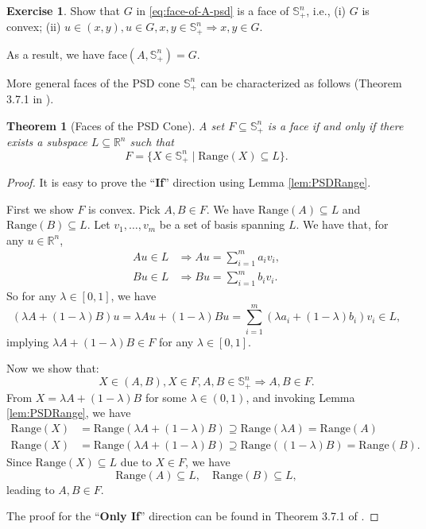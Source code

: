 \documentclass[
]{book}
\newtheorem{theorem}{Theorem}[chapter]
\theoremstyle{definition}
\theoremstyle{definition}
\theoremstyle{definition}
\newtheorem{exercise}{Exercise}[chapter]
\theoremstyle{definition}
\theoremstyle{remark}
\begin{document}
\begin{exercise}
Show that \(G\) in \eqref{eq:face-of-A-psd} is a face of \(\mathbb{S}^{n}_{+}\), i.e., (i) \(G\) is convex; (ii) \(u \in (x,y), u \in G, x,y \in \mathbb{S}^{n}_{+} \Rightarrow x,y \in G\).
\end{exercise}

As a result, we have \(\mathrm{face}(A,\mathbb{S}^{n}_{+}) = G\).

More general faces of the PSD cone \(\mathbb{S}^{n}_{+}\) can be characterized as follows (Theorem 3.7.1 in \citep{wolkowicz12book-sdp}).

\begin{theorem}[Faces of the PSD Cone]
\protect\hypertarget{thm:FacePSD}{}\label{thm:FacePSD}A set \(F \subseteq \mathbb{S}^{n}_{+}\) is a face if and only if there exists a subspace \(L \subseteq \mathbb{R}^{n}\) such that
\[
F = \{ X \in \mathbb{S}^{n}_{+} \mid \mathrm{Range}(X) \subseteq L \}.
\]
\end{theorem}

\begin{proof}
It is easy to prove the ``\textbf{If}'' direction using Lemma \ref{lem:PSDRange}.

First we show \(F\) is convex. Pick \(A,B \in F\). We have \(\mathrm{Range}(A) \subseteq L\) and \(\mathrm{Range}(B) \subseteq L\). Let \(v_1,\dots,v_m\) be a set of basis spanning \(L\). We have that, for any \(u \in \mathbb{R}^{n}\),
\begin{equation}
\begin{split}
A u \in L & \Rightarrow Au = \sum_{i=1}^m a_i v_i, \\
B u \in L & \Rightarrow Bu = \sum_{i=1}^m b_i v_i. 
\end{split}
\end{equation}
So for any \(\lambda \in [0,1]\), we have
\[
(\lambda A + (1-\lambda) B) u = \lambda Au + (1-\lambda) Bu = \sum_{i=1}^m (\lambda a_i + (1-\lambda) b_i ) v_i \in L,
\]
implying \(\lambda A + (1-\lambda) B \in F\) for any \(\lambda \in [0,1]\).

Now we show that:
\[
X \in (A,B), X \in F, A,B \in \mathbb{S}^{n}_{+} \Rightarrow A, B \in F.
\]
From \(X = \lambda A + (1-\lambda) B\) for some \(\lambda \in (0,1)\), and invoking Lemma \ref{lem:PSDRange}, we have
\begin{equation}
\begin{split}
\mathrm{Range}(X) & = \mathrm{Range}(\lambda A + (1-\lambda) B) \supseteq \mathrm{Range}(\lambda A) = \mathrm{Range}(A) \\
\mathrm{Range}(X) & = \mathrm{Range}(\lambda A + (1-\lambda) B) \supseteq \mathrm{Range}((1-\lambda) B) = \mathrm{Range}(B).
\end{split}
\end{equation}
Since \(\mathrm{Range}(X) \subseteq L\) due to \(X \in F\), we have
\[
\mathrm{Range}(A) \subseteq L, \quad \mathrm{Range}(B) \subseteq L,
\]
leading to \(A,B \in F\).

The proof for the ``\textbf{Only If}'' direction can be found in Theorem 3.7.1 of \citep{wolkowicz12book-sdp}.
\end{proof}
\end{document}
